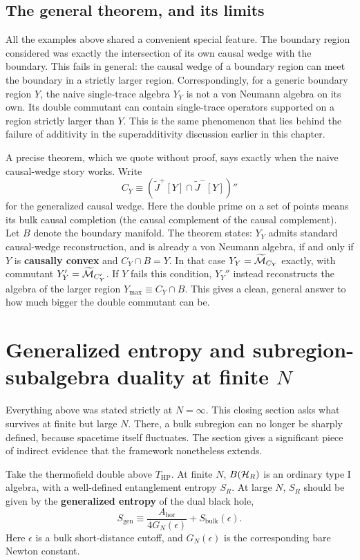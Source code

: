 \subsection*{The general theorem, and its limits}

All the examples above shared a convenient special feature. The boundary region considered was exactly the
intersection of its own causal wedge with the boundary. This fails in general: the causal wedge of a boundary
region can meet the boundary in a strictly larger region. Correspondingly, for a generic boundary region $Y$,
the naive single-trace algebra $Y_Y$ is not a von Neumann algebra on its own. Its double commutant can contain
single-trace operators supported on a region strictly larger than $Y$. This is the same phenomenon that lies
behind the failure of additivity in the superadditivity discussion earlier in this chapter.

A precise theorem, which we quote without proof, says exactly when the naive causal-wedge story works. Write
\[
C_Y\equiv (\widetilde J^+[Y]\cap\widetilde J^-[Y])''
\]
for the generalized causal wedge. Here the double prime on a set of points means its bulk causal completion
(the causal complement of the causal complement). Let $B$ denote the boundary manifold. The theorem states:
$Y_Y$ admits standard causal-wedge reconstruction, and is already a von Neumann algebra, if and only if $Y$ is
\textbf{causally convex} and $C_Y\cap B=Y$. In that case $Y_Y=\widetilde{\mathcal{M}}_{C_Y}$ exactly, with commutant
$Y_Y'=\widetilde{\mathcal{M}}_{C_Y'}$. If $Y$ fails this condition, $Y_Y''$ instead reconstructs the algebra of the larger
region $Y_{\max}\equiv C_Y\cap B$. This gives a clean, general answer to how much bigger the double commutant can
be.

\section{Generalized entropy and subregion-subalgebra duality at finite \texorpdfstring{$N$}{N}}

Everything above was stated strictly at $N=\infty$. This closing section asks what survives at finite but large
$N$. There, a bulk subregion can no longer be sharply defined, because spacetime itself fluctuates. The
section gives a significant piece of indirect evidence that the framework nonetheless extends.

Take the thermofield double above $T_{\text{HP}}$. At finite $N$, $B(\mathcal{H}_R)$ is an ordinary type I algebra,
with a well-defined entanglement entropy $S_R$. At large $N$, $S_R$ should be given by the \textbf{generalized
entropy} of the dual black hole,
\begin{equation}
S_{\text{gen}} \equiv \frac{A_{\text{hor}}}{4G_N(\epsilon)} + S_{\text{bulk}}(\epsilon) .
\label{eq:Sgen_cutoff}
\end{equation}
Here $\epsilon$ is a bulk short-distance cutoff, and $G_N(\epsilon)$ is the corresponding bare Newton constant.


